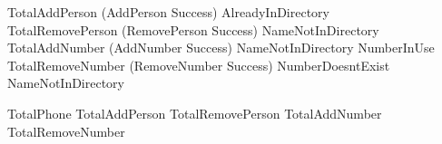 \documentclass{article}
\begin{document}
\begin{zed}
TotalAddPerson  (AddPerson \land Success) \lor AlreadyInDirectory \\
TotalRemovePerson  (RemovePerson \land Success) \lor NameNotInDirectory \\
TotalAddNumber  (AddNumber \land Success) \lor NameNotInDirectory \lor NumberInUse \\
TotalRemoveNumber  (RemoveNumber \land Success) \lor NumberDoesntExist \lor NameNotInDirectory \\
\end{zed}

\begin{zed}
TotalPhone  TotalAddPerson \lor TotalRemovePerson \lor TotalAddNumber  \lor TotalRemoveNumber
\end{zed}
\end{document}
